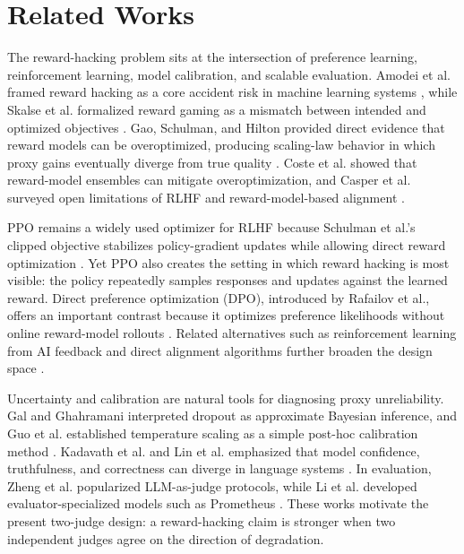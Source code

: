 \documentclass[twocolumn,10pt]{article}
\begin{document}
\section{Related Works}
The reward-hacking problem sits at the intersection of preference learning, reinforcement learning, model calibration, and scalable evaluation. Amodei et al. framed reward hacking as a core accident risk in machine learning systems \cite{amodei2016concrete}, while Skalse et al. formalized reward gaming as a mismatch between intended and optimized objectives \cite{skalse2022defining}. Gao, Schulman, and Hilton provided direct evidence that reward models can be overoptimized, producing scaling-law behavior in which proxy gains eventually diverge from true quality \cite{gao2023scaling}. Coste et al. showed that reward-model ensembles can mitigate overoptimization, and Casper et al. surveyed open limitations of RLHF and reward-model-based alignment \cite{coste2023reward,casper2023open}.

PPO remains a widely used optimizer for RLHF because Schulman et al.'s clipped objective stabilizes policy-gradient updates while allowing direct reward optimization \cite{schulman2017proximal}. Yet PPO also creates the setting in which reward hacking is most visible: the policy repeatedly samples responses and updates against the learned reward. Direct preference optimization (DPO), introduced by Rafailov et al., offers an important contrast because it optimizes preference likelihoods without online reward-model rollouts \cite{rafailov2023direct}. Related alternatives such as reinforcement learning from AI feedback and direct alignment algorithms further broaden the design space \cite{lee2023rlaif,azarruss2024kto}.

Uncertainty and calibration are natural tools for diagnosing proxy unreliability. Gal and Ghahramani interpreted dropout as approximate Bayesian inference, and Guo et al. established temperature scaling as a simple post-hoc calibration method \cite{gal2016dropout,guo2017calibration}. Kadavath et al. and Lin et al. emphasized that model confidence, truthfulness, and correctness can diverge in language systems \cite{kadavath2022language,lin2022truthfulqa}. In evaluation, Zheng et al. popularized LLM-as-judge protocols, while Li et al. developed evaluator-specialized models such as Prometheus \cite{zheng2023judging,li2024prometheus}. These works motivate the present two-judge design: a reward-hacking claim is stronger when two independent judges agree on the direction of degradation.
\end{document}

